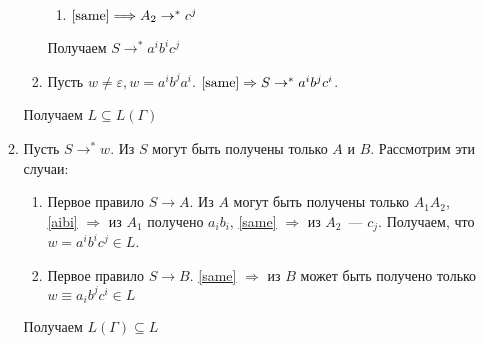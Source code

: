 \documentclass[a4paper]{article}
\begin{document}
\begin{enumerate}
\begin{enumerate}[1.]
\begin{enumerate}
\begin{enumerate}
\item $\ref{same}\Longrightarrow A_2\rightarrow^* c^j$
\end{enumerate}
Получаем $S\rightarrow^* a^ib^ic^j$
\item Пусть $w\neq\varepsilon, w=a^ib^ja^i$. $\ref{same}\Rightarrow S\rightarrow^* a^ib^jc^i$.
\end{enumerate}
Получаем $\boxed{L\subseteq L(\Gamma)}$
\item Пусть $S\longrightarrow^* w$. Из $S$ могут быть получены только $A$ и $B$. Рассмотрим эти случаи:\begin{enumerate}
\item Первое правило $S\longrightarrow A$. Из $A$ могут быть получены только $A_1A_2$, \ref{aibi} $\Rightarrow$ из $A_1$ получено $a_ib_i$, \ref{same} $\Rightarrow$ из $A_2$~--- $c_j$. Получаем, что $w=a^ib^ic^j\in L$.
\item Первое правило $S\longrightarrow B$. \ref{same} $\Rightarrow$ из $B$ может быть получено только $w\equiv a_ib^jc^i\in L$
\end{enumerate}
Получаем $\boxed{L(\Gamma)\subseteq L}$
\end{enumerate}
\end{enumerate}
\end{document}
